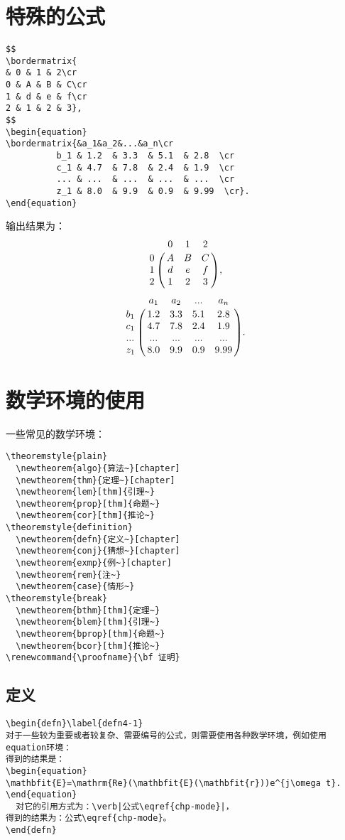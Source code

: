 \section{特殊的公式}\label{section4-8}
\begin{verbatim}
$$
\bordermatrix{
& 0 & 1 & 2\cr
0 & A & B & C\cr
1 & d & e & f\cr
2 & 1 & 2 & 3},
$$
\begin{equation}
\bordermatrix{&a_1&a_2&...&a_n\cr
          b_1 & 1.2  & 3.3  & 5.1  & 2.8  \cr
          c_1 & 4.7  & 7.8  & 2.4  & 1.9  \cr
          ... & ...  & ...  & ...  & ...  \cr
          z_1 & 8.0  & 9.9  & 0.9  & 9.99  \cr}.
\end{equation}
\end{verbatim}
输出结果为：
$$
\bordermatrix{
& 0 & 1 & 2\cr
0 & A & B & C\cr
1 & d & e & f\cr
2 & 1 & 2 & 3},
$$
\begin{equation}
\bordermatrix{&a_1&a_2&...&a_n\cr
          b_1 & 1.2  & 3.3  & 5.1  & 2.8  \cr
          c_1 & 4.7  & 7.8  & 2.4  & 1.9  \cr
          ... & ...  & ...  & ...  & ...  \cr
          z_1 & 8.0  & 9.9  & 0.9  & 9.99  \cr}.
\end{equation}

\section{数学环境的使用}\label{section4-9}


一些常见的数学环境：
\begin{verbatim}
\theoremstyle{plain}
  \newtheorem{algo}{算法~}[chapter]
  \newtheorem{thm}{定理~}[chapter]
  \newtheorem{lem}[thm]{引理~}
  \newtheorem{prop}[thm]{命题~}
  \newtheorem{cor}[thm]{推论~}
\theoremstyle{definition}
  \newtheorem{defn}{定义~}[chapter]
  \newtheorem{conj}{猜想~}[chapter]
  \newtheorem{exmp}{例~}[chapter]
  \newtheorem{rem}{注~}
  \newtheorem{case}{情形~}
\theoremstyle{break}
  \newtheorem{bthm}[thm]{定理~}
  \newtheorem{blem}[thm]{引理~}
  \newtheorem{bprop}[thm]{命题~}
  \newtheorem{bcor}[thm]{推论~}
\renewcommand{\proofname}{\bf 证明}
\end{verbatim}

\subsection{定义}\label{defn}
\begin{verbatim}
\begin{defn}\label{defn4-1}
对于一些较为重要或者较复杂、需要编号的公式，则需要使用各种数学环境，例如使用equation环境：
得到的结果是：
\begin{equation}
\mathbfit{E}=\mathrm{Re}(\mathbfit{E}(\mathbfit{r}))e^{j\omega t}.
\end{equation}
  对它的引用方式为：\verb|公式\eqref{chp-mode}|，
得到的结果为：公式\eqref{chp-mode}。
\end{defn}
\end{verbatim}

